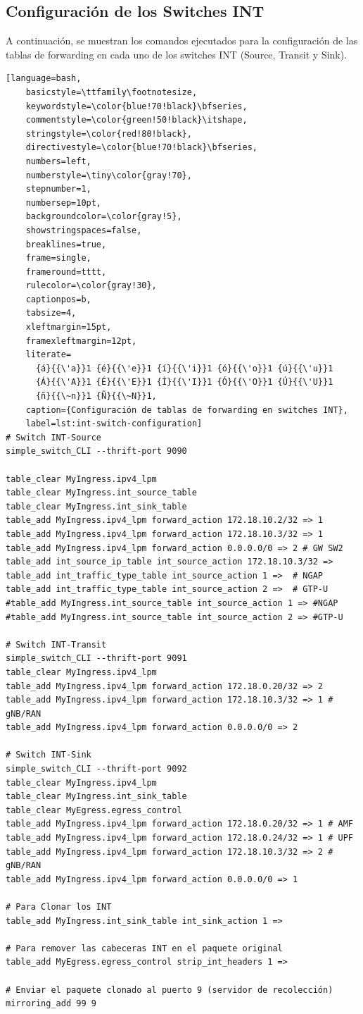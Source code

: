 \subsection{Configuración de los Switches INT}
A continuación, se muestran los comandos ejecutados para la configuración de las tablas de forwarding en cada uno de los switches INT (Source, Transit y Sink).
\begin{lstlisting}[language=bash,
    basicstyle=\ttfamily\footnotesize,
    keywordstyle=\color{blue!70!black}\bfseries,
    commentstyle=\color{green!50!black}\itshape,
    stringstyle=\color{red!80!black},
    directivestyle=\color{blue!70!black}\bfseries,
    numbers=left,
    numberstyle=\tiny\color{gray!70},
    stepnumber=1,
    numbersep=10pt,
    backgroundcolor=\color{gray!5},
    showstringspaces=false,
    breaklines=true,
    frame=single,
    frameround=tttt,
    rulecolor=\color{gray!30},
    captionpos=b,
    tabsize=4,
    xleftmargin=15pt,
    framexleftmargin=12pt,
    literate=
      {á}{{\'a}}1 {é}{{\'e}}1 {í}{{\'i}}1 {ó}{{\'o}}1 {ú}{{\'u}}1
      {Á}{{\'A}}1 {É}{{\'E}}1 {Í}{{\'I}}1 {Ó}{{\'O}}1 {Ú}{{\'U}}1
      {ñ}{{\~n}}1 {Ñ}{{\~N}}1,
    caption={Configuración de tablas de forwarding en switches INT}, 
    label=lst:int-switch-configuration] 
# Switch INT-Source
simple_switch_CLI --thrift-port 9090

table_clear MyIngress.ipv4_lpm
table_clear MyIngress.int_source_table
table_clear MyIngress.int_sink_table
table_add MyIngress.ipv4_lpm forward_action 172.18.10.2/32 => 1
table_add MyIngress.ipv4_lpm forward_action 172.18.10.3/32 => 1
table_add MyIngress.ipv4_lpm forward_action 0.0.0.0/0 => 2 # GW SW2
table_add int_source_ip_table int_source_action 172.18.10.3/32 => 
table_add int_traffic_type_table int_source_action 1 =>  # NGAP
table_add int_traffic_type_table int_source_action 2 =>  # GTP-U
#table_add MyIngress.int_source_table int_source_action 1 => #NGAP
#table_add MyIngress.int_source_table int_source_action 2 => #GTP-U

# Switch INT-Transit
simple_switch_CLI --thrift-port 9091
table_clear MyIngress.ipv4_lpm
table_add MyIngress.ipv4_lpm forward_action 172.18.0.20/32 => 2  
table_add MyIngress.ipv4_lpm forward_action 172.18.10.3/32 => 1 # gNB/RAN
table_add MyIngress.ipv4_lpm forward_action 0.0.0.0/0 => 2      

# Switch INT-Sink
simple_switch_CLI --thrift-port 9092
table_clear MyIngress.ipv4_lpm
table_clear MyIngress.int_sink_table
table_clear MyEgress.egress_control
table_add MyIngress.ipv4_lpm forward_action 172.18.0.20/32 => 1 # AMF
table_add MyIngress.ipv4_lpm forward_action 172.18.0.24/32 => 1 # UPF
table_add MyIngress.ipv4_lpm forward_action 172.18.10.3/32 => 2 # gNB/RAN
table_add MyIngress.ipv4_lpm forward_action 0.0.0.0/0 => 1

# Para Clonar los INT 
table_add MyIngress.int_sink_table int_sink_action 1 =>

# Para remover las cabeceras INT en el paquete original
table_add MyEgress.egress_control strip_int_headers 1 =>

# Enviar el paquete clonado al puerto 9 (servidor de recolección)
mirroring_add 99 9

\end{lstlisting}


